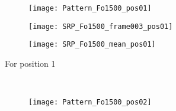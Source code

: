 \begin{figure}
  \centering
  \begin{subfigure}[t]{0.47\textwidth}
    \begin{minipage}[t]{\textwidth}
      \begin{subfigure}[t]{0.3\textwidth}
        \texttt{[image: Pattern\_Fo1500\_pos01]}
        \label{fig:Pattern_Fo1500_pos01}
      \end{subfigure}
      \begin{subfigure}[t]{0.3\textwidth}
        \texttt{[image: SRP\_Fo1500\_frame003\_pos01]}
        \label{fig:SRP_Fo1500_pos01}
      \end{subfigure}
      \begin{subfigure}[t]{0.3\textwidth}
        \texttt{[image: SRP\_Fo1500\_mean\_pos01]}
        \label{fig:SRP_Fo1500_mean_pos01}
      \end{subfigure}
      \vspace{\verticalSpacingSRPMaps}
      \caption{\centering For position 1}
      \label{fig:SRPvsModel_Fo1500_position1}
      \vspace{0.25cm}
    \end{minipage}
  \end{subfigure}
  ~%
  \begin{subfigure}[t]{0.47\textwidth}
    \begin{minipage}[t]{\textwidth}
      \begin{subfigure}[t]{0.3\textwidth}
        \texttt{[image: Pattern\_Fo1500\_pos02]}
        \label{fig:Pattern_Fo1500_pos02}
      \end{subfigure}
      \begin{subfigure}[t]{0.3\textwidth}

\end{subfigure}
\end{minipage}
\end{subfigure}
\end{figure}
